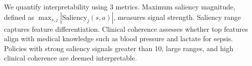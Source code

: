 We quantify interpretability using 3 metrics. Maximum saliency magnitude, defined as $\max_{s, j} |\text{Saliency}_j(s, a)|$, measures signal strength. Saliency range captures feature differentiation. Clinical coherence assesses whether top features align with medical knowledge such as blood pressure and lactate for sepsis. Policies with strong saliency signals greater than 10, large ranges, and high clinical coherence are deemed interpretable.

